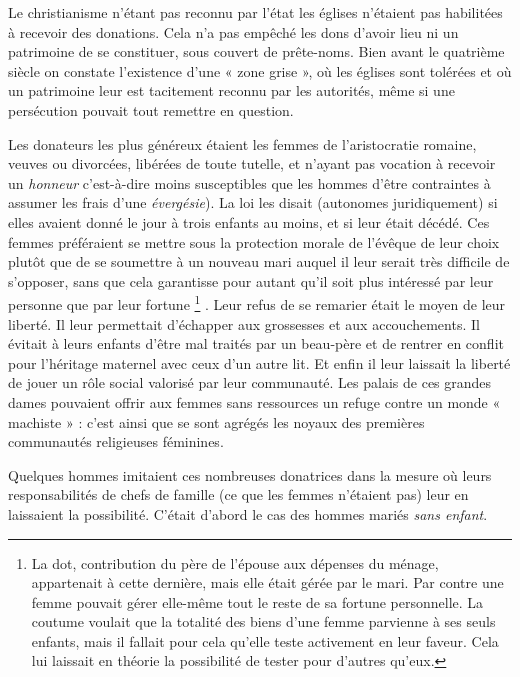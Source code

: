  Le christianisme n'étant pas reconnu par l'état les églises n'étaient pas habilitées à recevoir des donations. Cela n'a pas empêché les dons d'avoir lieu ni un patrimoine de se constituer, sous couvert de prête-noms. Bien avant le quatrième siècle on constate l'existence d'une « zone grise », où les églises sont tolérées et où un patrimoine leur est tacitement reconnu par les autorités, même si une persécution pouvait tout remettre en question. 

 Les donateurs les plus généreux étaient les femmes de l'aristocratie romaine, veuves ou divorcées, libérées de toute tutelle, et n'ayant pas vocation à recevoir un \emph{honneur} c'est-à-dire moins susceptibles que les hommes d'être contraintes à assumer les frais d'une \emph{évergésie}). La loi les disait  (autonomes juridiquement) si elles avaient donné le jour à trois enfants au moins, et si leur  était décédé. Ces femmes préféraient se mettre sous la protection morale de l'évêque de leur choix plutôt que de se soumettre à un nouveau mari auquel il leur serait très difficile de s'opposer, sans que cela garantisse pour autant qu'il soit plus intéressé par leur personne que par leur fortune
\footnote{La dot, contribution du père de l'épouse aux dépenses du ménage, appartenait à cette dernière, mais elle était gérée par le mari. Par contre une femme  pouvait gérer elle-même tout le reste de sa fortune personnelle. La coutume voulait que la totalité des biens d'une femme parvienne à ses seuls enfants, mais il fallait pour cela qu'elle teste activement en leur faveur. Cela lui laissait en théorie la possibilité de tester pour d'autres qu'eux.}%
. Leur refus de se remarier était le moyen de leur liberté. Il leur permettait d'échapper aux grossesses et aux accouchements. Il évitait à leurs enfants d'être mal traités par un beau-père et de rentrer en conflit pour l'héritage maternel avec ceux d'un autre lit. Et enfin il leur laissait la liberté de jouer un rôle social valorisé par leur communauté. Les palais de ces grandes dames pouvaient offrir aux femmes sans ressources un refuge contre un monde « machiste » : c'est ainsi que se sont agrégés les noyaux des premières communautés religieuses féminines. 

 Quelques hommes imitaient ces nombreuses donatrices dans la mesure où leurs responsabilités de chefs de famille (ce que les femmes n'étaient pas) leur en laissaient la possibilité. C'était d'abord le cas des hommes mariés \emph{sans enfant}.

